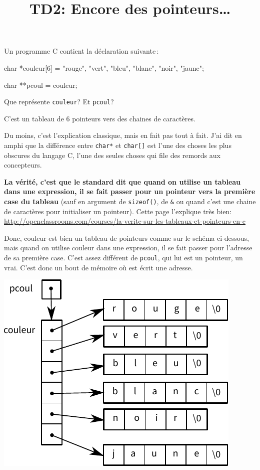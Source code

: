\documentclass[10pt]{article}\usepackage[nu,correction]{esial}
\begin{document}
\title{TD2: Encore des pointeurs\ldots}
\maketitle

\bigskip\bigskip\Exercice Un programme C contient la déclaration suivante\,:

\medskip

\begin{boxedverbatim}
  char *couleur[6] = {"rouge", "vert", "bleu", "blanc", "noir", "jaune"};

  char **pcoul = couleur;
\end{boxedverbatim}

\Question Que représente {\tt couleur}? Et \texttt{pcoul}?

\begin{Reponse}
  C'est un tableau de 6 pointeurs vers des chaines de caractères. 

  Du moins, c'est l'explication classique, mais en fait pas tout à
  fait. J'ai dit en amphi que la différence entre \verb+char*+ et
  \verb+char[]+ est l'une des choses les plus obscures du langage C,
  l'une des seules choses qui file des remords aux concepteurs. 

  \textbf{La vérité, c'est que le standard dit que quand on utilise un
    tableau dans une expression, il se fait passer pour un pointeur
    vers la première case du tableau} (sauf en argument de
  \verb+sizeof()+, de \verb+&+ ou quand c'est une chaine de caractères
  pour initialiser un pointeur). Cette page l'explique très bien:
  \url{http://openclassrooms.com/courses/la-verite-sur-les-tableaux-et-pointeurs-en-c}

  Donc, couleur est bien un tableau de pointeurs comme sur le schéma
  ci-dessous, mais quand on utilise couleur dans une expression, il se
  fait passer pour l'adresse de sa première case.  C'est assez
  différent de \texttt{pcoul}, qui lui est un pointeur, un vrai. C'est
  donc un bout de mémoire où est écrit une adresse.

  \includegraphics{memoire-couleur.pdf}


\end{Reponse}
\end{document}
